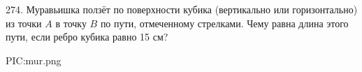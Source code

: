 274. Муравьишка ползёт по поверхности кубика (вертикально или горизонтально) из точки $A$ в точку $B$ по пути, отмеченному стрелками. Чему равна длина этого пути, если ребро кубика равно 15 см?
\begin{center}
{{PIC:mur.png}}
\end{center}
